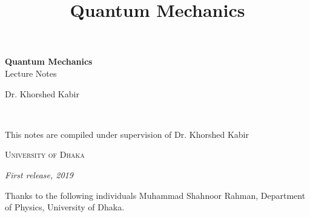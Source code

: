 \documentclass[11pt,fleqn]{book} %
\begin{document}
\title{Quantum Mechanics}


\begingroup
\thispagestyle{empty}
\centering
\vspace*{5cm}
\par\normalfont\fontsize{35}{35}\sffamily\selectfont
\textbf{Quantum Mechanics}\\
{\LARGE Lecture Notes}\par %
\vspace*{1cm}
{\Huge Dr. Khorshed Kabir}\par %
\endgroup


\newpage
~\vfill
\thispagestyle{empty}





{\noindent This notes are compiled under supervision of Dr. Khorshed Kabir} %

{\noindent \textsc{University of Dhaka}}

{\noindent \textit{First release, %
	 2019}} %


\newpage


Thanks to the following individuals 
{\centering
Muhammad Shahnoor Rahman, Department of Physics, University of Dhaka.}



\end{document}
